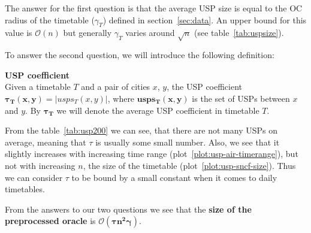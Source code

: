 		\noindent The answer for the first question is that the average USP size is equal to the OC radius of the timetable ($\gamma_{T}$) defined in section~\ref{sec:data}. An upper bound for this value is $\mathcal{O}(n)$ but generally $\gamma_{T}$ varies around $\sqrt{n}$ (see table~\ref{tab:uspsize}). 
		
		\noindent To answer the second question, we will introduce the following definition:
		
		\begin{definition}
	        \textbf{USP coefficient} \\
			Given a timetable $T$ and a pair of cities $x$, $y$, the USP coefficient $\bm{\tau_{T}(x, y)} = |usps_{T}(x, y)|$, where $\bm{usps_{T}(x, y)}$ is the set of USPs between $x$ and $y$. By $\bm{\tau_{T}}$ we will denote the average USP coefficient in timetable $T$.
	    \end{definition}
	    
	    \noindent From the table~\ref{tab:usp200} we can see, that there are not many USPs on average, meaning that $\tau$ is usually some small number. Also, we see that it slightly increases with increasing time range (plot~\ref{plot:usp-air-timerange}), but not with increasing $n$, the size of the timetable (plot~\ref{plot:usp-sncf-size}). Thus we can consider $\tau$ to be bound by a small constant when it comes to daily timetables. 
	    
	    From the answers to our two questions we see that the \textbf{size of the preprocessed oracle} is $\bm{\mathcal{O}(\tau n^{2} \gamma)}$.
	
